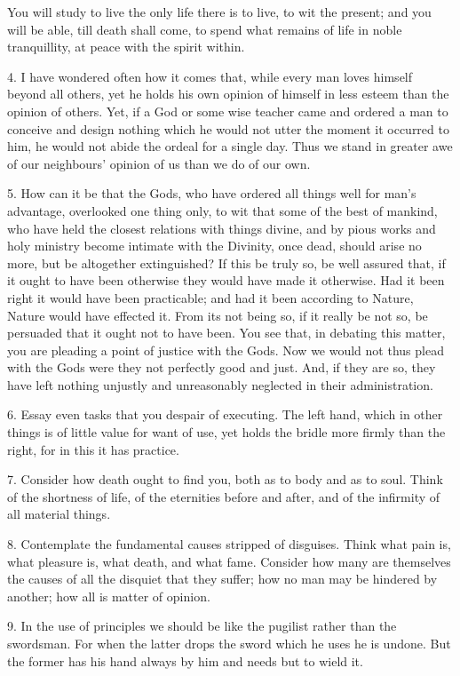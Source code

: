 \documentclass{book}
\begin{document}
You will study to live the only life there is to live, to wit the
present; and you will be able, till death shall come, to spend what
remains of life in noble tranquillity, at peace with the spirit
within.

4. I have wondered often how it comes that, while every man loves
himself beyond all others, yet he holds his own opinion of himself in
less esteem than the opinion of others. Yet, if a God or some wise
teacher came and ordered a man to conceive and design nothing which he
would not utter the moment it occurred to him, he would not abide the
ordeal for a single day. Thus we stand in greater awe of our
neighbours' opinion of us than we do of our own.

5. How can it be that the Gods, who have ordered all things well for
man's advantage, overlooked one thing only, to wit that some of the
best of mankind, who have held the closest relations with things
divine, and by pious works and holy ministry become intimate with the
Divinity, once dead, should arise no more, but be altogether
extinguished? If this be truly so, be well assured that, if it ought
to have been otherwise they would have made it otherwise. Had it been
right it would have been practicable; and had it been according to
Nature, Nature would have effected it. From its not being so, if it
really be not so, be persuaded that it ought not to have been. You see
that, in debating this matter, you are pleading a point of justice
with the Gods. Now we would not thus plead with the Gods were they not
perfectly good and just. And, if they are so, they have left nothing
unjustly and unreasonably neglected in their administration.

6. Essay even tasks that you despair of executing. The left hand,
which in other things is of little value for want of use, yet holds
the bridle more firmly than the right, for in this it has practice.

7. Consider how death ought to find you, both as to body and as to
soul. Think of the shortness of life, of the eternities before and
after, and of the infirmity of all material things.

8. Contemplate the fundamental causes stripped of disguises. Think
what pain is, what pleasure is, what death, and what fame. Consider
how many are themselves the causes of all the disquiet that they
suffer; how no man may be hindered by another; how all is matter of
opinion.

9. In the use of principles we should be like the pugilist rather than
the swordsman. For when the latter drops the sword which he uses he is
undone. But the former has his hand always by him and needs but to
wield it.
\end{document}
